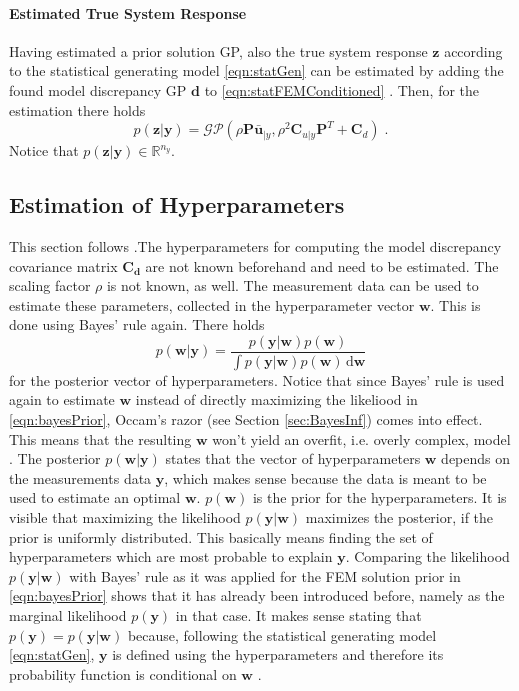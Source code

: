\documentclass[%
  a4paper,oneside,%
  11pt,%
  smallchapters,
  style=printdev,
  extramargin,
  green,%
  rgb, <cmyk>
  ]{tubsbook}
\begin{document}
\paragraph{Estimated True System Response}
Having estimated a prior solution GP, also the true system response $\bm{z}$ according to the statistical generating model \eqref{eqn:statGen} can be estimated by adding the found model discrepancy GP $\bm{d}$ to \eqref{eqn:statFEMConditioned} \cite[p. 11]{girolami2021}. Then, for the estimation there holds
\begin{equation}
p(\bm{z}|\bm{y}) = \mathcal{GP}(\rho\bm{P}\bar{\bm{u}}_{|y}, \rho^2\bm{C}_{u|y}\bm{P}^T + \bm{C}_d) \;.
\label{eqn:trueProcEstEq}
\end{equation}
Notice that $p(\bm{z}|\bm{y}) \in \mathbb{R}^{n_y}$. 


\subsection{Estimation of Hyperparameters }
\label{sec:HyperParEst}
This section follows \cite[p. 12 ff.]{girolami2021}.The hyperparameters for computing the model discrepancy covariance matrix $\bm{C_d}$ are not known beforehand and need to be estimated. The scaling factor $\rho$ is not known, as well. The measurement data can be used to estimate these parameters, collected in the hyperparameter vector $\bm{w}$. This is done using Bayes' rule again. There holds
%
\begin{equation}
p(\bm{w}|\bm{y}) = \frac{p(\bm{y}|\bm{w}) p(\bm{w})}{\int p(\bm{y}|\bm{w}) p(\bm{w}) \, \mathrm{d}\bm{w}}
\label{eqn:bayesHyperp}
\end{equation}
%
for the posterior vector of hyperparameters. Notice that since Bayes' rule is used again to estimate $\bm{w}$ instead of directly maximizing the likeliood in \eqref{eqn:bayesPrior}, Occam's razor (see Section \ref{sec:BayesInf}) comes into effect. This means that the resulting $\bm{w}$ won't yield an overfit, i.e. overly complex, model \cite{girolami2021,MacKay1991}. The posterior $p(\bm{w}|\bm{y})$ states that the vector of hyperparameters $\bm{w}$ depends on the measurements data $\bm{y}$, which makes sense because the data is meant to be used to estimate an optimal $\bm{w}$. $p(\bm{w})$ is the prior for the hyperparameters. It is visible that maximizing the likelihood $p(\bm{y}|\bm{w})$ maximizes the posterior, if the prior is uniformly distributed. This basically means finding the set of hyperparameters which are most probable to explain $\bm{y}$. Comparing the likelihood $p(\bm{y}|\bm{w})$ with Bayes' rule as it was applied for the FEM solution prior in \eqref{eqn:bayesPrior} shows that it has already been introduced before, namely as the marginal likelihood $p(\bm{y})$ in that case. It makes sense stating that $p(\bm{y}) = p(\bm{y}|\bm{w})$ because, following the statistical generating model \eqref{eqn:statGen}, $\bm{y}$ is defined using the hyperparameters and therefore its probability function is conditional on $\bm{w}$ \cite[p.12]{girolami2021}. 
\end{document}
